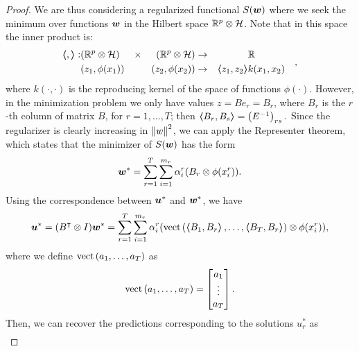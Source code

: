 \begin{proof}
    We are thus considering a regularized functional $S(\bm{w})$ where we seek the minimum over functions $\bm{w}$ in the Hilbert space $\mathbb{R}^p \otimes \mathcal{H}$. Note that in this space the inner product is:
    \begin{equation}
        \nonumber
        \begin{aligned}
            \bm{\left\langle} ,  \bm{\right\rangle}: & (\mathbb{R}^p \otimes \mathcal{H}) & \times &  & (\mathbb{R}^p \otimes \mathcal{H}) & \to &                 & \mathbb{R}      & \\
                       & (z_1, \phi(x_1))                 &        &  & (z_2, \phi(x_2))                 & \to & \bm{\left\langle} z_1, z_2 \bm{\right\rangle} & k(x_1, x_2) &
        \end{aligned},
    \end{equation}
    where $k(\cdot, \cdot)$ is the reproducing kernel of the space of functions $\phi(\cdot)$.
    However, in the minimization problem we only have values $z = B e_r = B_r$, where $B_r$ is the $r$-th column of matrix $B$, for $r=1, \ldots, T$; then $\bm{\left\langle} B_r, B_s \bm{\right\rangle} = \left(E^{-1}\right)_{rs}.$
    Since the regularizer is clearly increasing in $\left\lVert w\right\rVert^2$, we can apply the Representer theorem, which states that the minimizer of $S(\bm{w})$ has the form
    \begin{equation}
        \nonumber
        {\bm{w}}^* = \sum_{r=1}^T \sum_{i=1}^{m_r} \alpha_i^r (B_r \otimes \phi(x_i^r)) .
    \end{equation}
    Using the correspondence between ${\bm{u}}^*$ and ${\bm{w}}^*$, we have
    \begin{equation}
        \nonumber
        {\bm{u}}^* = (B^\intercal \otimes I) {\bm{w}}^* =  \sum_{r=1}^T \sum_{i=1}^{m_r} \alpha_i^r (\bm{\text{vect}}\left(\bm{\left\langle} B_1, B_r \bm{\right\rangle}, \ldots, \bm{\left\langle} B_T, B_r \bm{\right\rangle}\right) \otimes \phi(x_i^r)),
    \end{equation}
    where we define $\bm{\text{vect}}\left(a_1, \ldots, a_T\right)$ as
    $$ \bm{\text{vect}}\left(a_1, \ldots, a_T\right) = 
        \begin{bmatrix}
            a_1 \\
            \vdots \\
            a_T \\
        \end{bmatrix}.
    $$
    Then, we can recover the predictions corresponding to the solutions $u_r^*$ as
    \begin{equation}
        \nonumber
        \begin{aligned}

\end{aligned}
\end{equation}
\end{proof}
